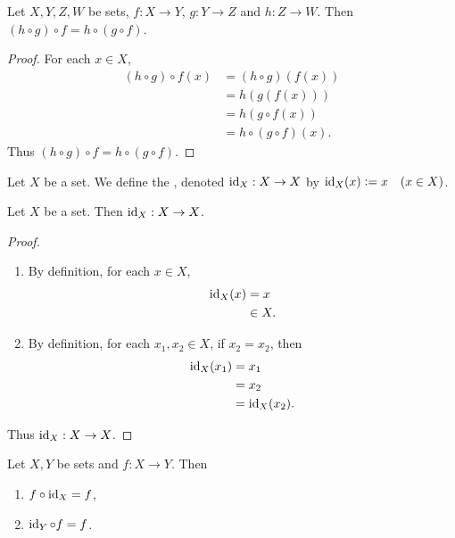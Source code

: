 \documentclass{book}
\begin{document}
	\begin{ex}
		Let $X,Y,Z, W$ be sets, $f:X \rightarrow Y$, $g:Y \rightarrow Z$ and $h:Z \rightarrow W$. Then $(h \circ g) \circ f = h \circ (g \circ f)$.
	\end{ex}
	
	\begin{proof}
		For each $x \in X$,
		\begin{align*}
			(h \circ g) \circ f(x)
			& = (h \circ g) (f(x)) \\
			& = h(g(f(x))) \\
			& = h(g \circ f(x)) \\
			& = h \circ (g \circ f)(x).
		\end{align*}
		Thus $(h \circ g) \circ f = h \circ (g \circ f)$.
	\end{proof}
	
	\begin{defn}
		Let $X$ be a set. We define the , denoted $\operatorname{id}_X:X \rightarrow X$ by $\operatorname{id}_X(x) \vcentcolon= x \quad (x \in X)$.
	\end{defn}
	
	\begin{ex}
		Let $X$ be a set. Then $\operatorname{id}_X:X \rightarrow X$. 
	\end{ex}
	
	\begin{proof}\
		\begin{enumerate}
			\item By definition, for each $x \in X$, 
			\begin{align*}
				\operatorname{id}_X(x)
				& = x \\
				& \in X.
			\end{align*}
			\item By definition, for each $x_1, x_2 \in X$, if $x_2 = x_2$, then 
			\begin{align*}
				\operatorname{id}_X(x_1)
				& = x_1 \\
				& = x_2 \\
				& = \operatorname{id}_X(x_2).
			\end{align*}
		\end{enumerate}
		Thus $\operatorname{id}_X:X \rightarrow X$. 
	\end{proof}
	
	\begin{ex}
		Let $X,Y$ be sets and $f:X \rightarrow Y$. Then 
		\begin{enumerate}
			\item $f \circ \operatorname{id}_X = f$, 
			\item $\operatorname{id}_Y \circ f = f$.
		\end{enumerate}
	\end{ex}
	
\end{document}

